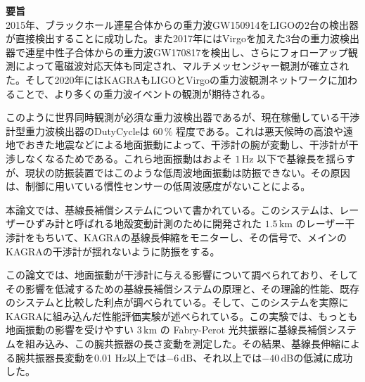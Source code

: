 \clearpage
{\huge \bf 要旨} \\

2015年、ブラックホール連星合体からの重力波GW150914をLIGOの2台の検出器が直接検出することに成功した。また2017年にはVirgoを加えた3台の重力波検出器で連星中性子合体からの重力波GW170817を検出し、さらにフォローアップ観測によって電磁波対応天体も同定され、マルチメッセンジャー観測が確立された。そして2020年にはKAGRAもLIGOとVirgoの重力波観測ネットワークに加わることで、より多くの重力波イベントの観測が期待される。

このように世界同時観測が必須な重力波検出器であるが、現在稼働している干渉計型重力波検出器のDutyCycleは $60\,\%$ 程度である。これは悪天候時の高浪や遠地でおきた地震などによる地面振動によって、干渉計の腕が変動し、干渉計が干渉しなくなるためである。これら地面振動はおよそ $1\, \mathrm{Hz}$ 以下で基線長を揺らすが、現状の防振装置ではこのような低周波地面振動は防振できない。その原因は、制御に用いている慣性センサーの低周波感度がないことによる。

本論文では、基線長補償システムについて書かれている。このシステムは、レーザーひずみ計と呼ばれる地殻変動計測のために開発された $1.5\,\mathrm{km}$ のレーザー干渉計をもちいて、KAGRAの基線長伸縮をモニターし、その信号で、メインのKAGRAの干渉計が揺れないように防振をする。

この論文では、地面振動が干渉計に与える影響について調べられており、そしてその影響を低減するための基線長補償システムの原理と、その理論的性能、既存のシステムと比較した利点が調べられている。そして、このシステムを実際にKAGRAに組み込んだ性能評価実験が述べられている。この実験では、もっとも地面振動の影響を受けやすい $3\,\mathrm{km}$ の Fabry-Perot 光共振器に基線長補償システムを組み込み、この腕共振器の長さ変動を測定した。その結果、基線長伸縮による腕共振器長変動を0.01 Hz以上では$-6 \,\mathrm{dB}$、それ以上では$-40 \,\mathrm{dB}$の低減に成功した。
